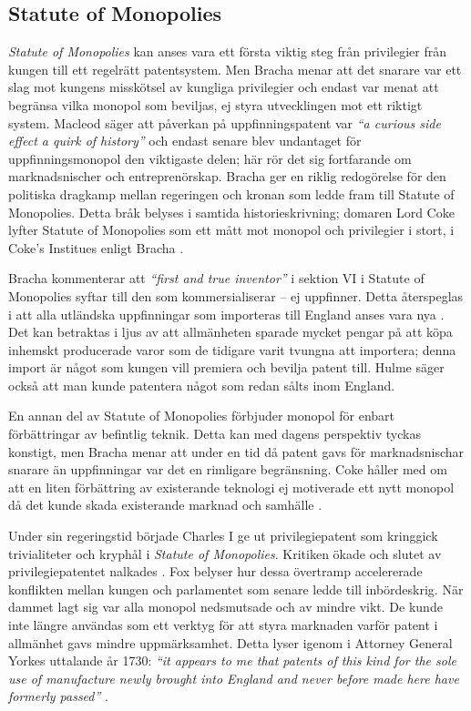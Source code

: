 
\subsection{Statute of Monopolies} 
\label{sub:statue_of_monopolies}

\emph{Statute of Monopolies} kan anses vara ett första viktig steg från privilegier från kungen till ett
regelrätt patentsystem. Men Bracha \cite{bracha} menar att det snarare var ett slag mot kungens misskötsel av kungliga privilegier
och endast var menat att begränsa vilka monopol som beviljas, ej styra utvecklingen mot ett riktigt
system. Macleod \cite{macleod2} säger att påverkan på uppfinningspatent  var \emph{``a curious side effect a quirk of history''} och endast
senare blev undantaget för uppfinningsmonopol den viktigaste delen; här rör det sig fortfarande om marknadsnischer och entreprenörskap. Bracha ger en riklig redogörelse för den politiska dragkamp mellan regeringen och kronan som ledde fram till Statute of Monopolies. Detta bråk belyses i samtida historieskrivning; domaren Lord Coke lyfter Statute of Monopolies som ett mått mot monopol och privilegier i stort, i Coke's Institues \cite{coke} enligt Bracha \cite{bracha}.

Bracha kommenterar att \emph{``first and true inventor''} i sektion VI i Statute of Monopolies syftar till den som kommersialiserar -- ej uppfinner. Detta återspeglas i att alla utländska uppfinningar som importeras till England anses vara nya \cite{bracha}. Det kan betraktas i ljus av att allmänheten sparade mycket pengar på att köpa inhemskt producerade varor som de tidigare varit tvungna att importera; denna import är något som kungen vill premiera och bevilja patent till. Hulme \cite{hulme2} säger också att man kunde patentera något som redan sålts inom England.  

En annan del av Statute of Monopolies förbjuder monopol för enbart förbättringar av befintlig teknik. Detta kan med dagens perspektiv tyckas konstigt, men Bracha \cite{bracha} menar att under en tid då patent gavs för marknadsnischar snarare än uppfinningar var det en rimligare begränsning.
Coke håller med om att en liten förbättring av existerande teknologi ej motiverade ett nytt monopol då det kunde skada existerande marknad och samhälle \cite{bracha}.

Under sin regeringstid började Charles I ge ut privilegiepatent som kringgick trivialiteter och kryphål i \emph{Statute of
Monopolies}. Kritiken ökade och slutet av privilegiepatentet nalkades \cite{bracha}. Fox \cite{Fox} belyser hur dessa övertramp accelererade
konflikten mellan kungen och parlamentet som senare ledde till inbördeskrig. När dammet lagt sig
var alla monopol nedsmutsade och av mindre vikt. De kunde inte längre användas som ett verktyg för att styra
marknaden varför patent i allmänhet gavs mindre uppmärksamhet. Detta lyser igenom i Attorney General Yorkes uttalande år 1730: \emph{``it appears to me that patents of this kind for the sole use of manufacture newly brought into England and never before made here have formerly passed''} \cite{macleod2}. 

